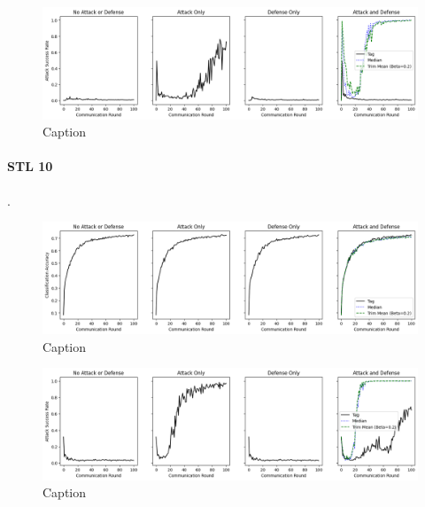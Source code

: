 \documentclass{article} %
\begin{document}
\begin{figure}[H]
    \centering
    \includegraphics[width=\textwidth]{cifar_100/neuro/tag/distributed/alpha10000--alpha_val10000/visuals/pois_accuracy--n_malicious2--beta0.2.png}
    \caption{Caption}
    \label{fig:my_label}
\end{figure}


%
\paragraph{STL 10}.

\begin{figure}[H]
    \centering
    \includegraphics[width=\textwidth]{stl_10/neuro/tag/distributed/alpha10000--alpha_val10000/visuals/clean_accuracy--n_malicious2--beta0.2.png}
    \caption{Caption}
    \label{fig:my_label}
\end{figure}

\begin{figure}[H]
    \centering
    \includegraphics[width=\textwidth]{stl_10/neuro/tag/distributed/alpha10000--alpha_val10000/visuals/pois_accuracy--n_malicious2--beta0.2.png}
    \caption{Caption}
    \label{fig:my_label}
\end{figure}
\end{document}
